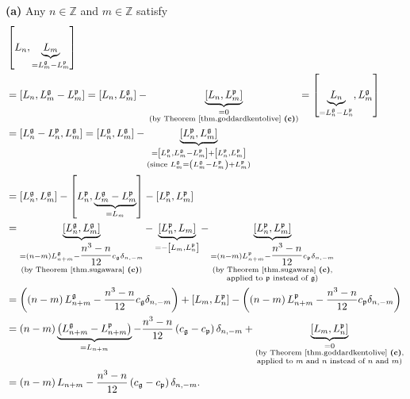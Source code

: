 \documentclass[etingof-lie.tex]{subfiles}
\begin{document}
\textbf{(a)} Any $n\in\mathbb{Z}$ and $m\in\mathbb{Z}$ satisfy%
\begin{align*}
&  \left[  L_{n},\underbrace{L_{m}}_{=L_{m}^{\mathfrak{g}}-L_{m}%
^{\mathfrak{p}}}\right] \\
&  =\left[  L_{n},L_{m}^{\mathfrak{g}}-L_{m}^{\mathfrak{p}}\right]  =\left[
L_{n},L_{m}^{\mathfrak{g}}\right]  -\underbrace{\left[  L_{n},L_{m}%
^{\mathfrak{p}}\right]  }_{\substack{=0\\\text{(by Theorem
\ref{thm.goddardkentolive} \textbf{(c)})}}}=\left[  \underbrace{L_{n}}%
_{=L_{n}^{\mathfrak{g}}-L_{n}^{\mathfrak{p}}},L_{m}^{\mathfrak{g}}\right] \\
&  =\left[  L_{n}^{\mathfrak{g}}-L_{n}^{\mathfrak{p}},L_{m}^{\mathfrak{g}%
}\right]  =\left[  L_{n}^{\mathfrak{g}},L_{m}^{\mathfrak{g}}\right]
-\underbrace{\left[  L_{n}^{\mathfrak{p}},L_{m}^{\mathfrak{g}}\right]
}_{\substack{=\left[  L_{n}^{\mathfrak{p}},L_{m}^{\mathfrak{g}}-L_{m}%
^{\mathfrak{p}}\right]  +\left[  L_{n}^{\mathfrak{p}},L_{m}^{\mathfrak{p}%
}\right]  \\\text{(since }L_{m}^{\mathfrak{g}}=\left(  L_{m}^{\mathfrak{g}%
}-L_{m}^{\mathfrak{p}}\right)  +L_{m}^{\mathfrak{p}}\text{)}}}\\
&  =\left[  L_{n}^{\mathfrak{g}},L_{m}^{\mathfrak{g}}\right]  -\left[
L_{n}^{\mathfrak{p}},\underbrace{L_{m}^{\mathfrak{g}}-L_{m}^{\mathfrak{p}}%
}_{=L_{m}}\right]  -\left[  L_{n}^{\mathfrak{p}},L_{m}^{\mathfrak{p}}\right]
\\
&  =\underbrace{\left[  L_{n}^{\mathfrak{g}},L_{m}^{\mathfrak{g}}\right]
}_{\substack{=\left(  n-m\right)  L_{n+m}^{\mathfrak{g}}-\dfrac{n^{3}-n}%
{12}c_{\mathfrak{g}}\delta_{n,-m}\\\text{(by Theorem \ref{thm.sugawara}
\textbf{(c)})}}}-\underbrace{\left[  L_{n}^{\mathfrak{p}},L_{m}\right]
}_{=-\left[  L_{m},L_{n}^{\mathfrak{p}}\right]  }-\underbrace{\left[
L_{n}^{\mathfrak{p}},L_{m}^{\mathfrak{p}}\right]  }_{\substack{=\left(
n-m\right)  L_{n+m}^{\mathfrak{p}}-\dfrac{n^{3}-n}{12}c_{\mathfrak{p}}%
\delta_{n,-m}\\\text{(by Theorem \ref{thm.sugawara} \textbf{(c)}%
,}\\\text{applied to }\mathfrak{p}\text{ instead of }\mathfrak{g}\text{)}}}\\
&  =\left(  \left(  n-m\right)  L_{n+m}^{\mathfrak{g}}-\dfrac{n^{3}-n}%
{12}c_{\mathfrak{g}}\delta_{n,-m}\right)  +\left[  L_{m},L_{n}^{\mathfrak{p}%
}\right]  -\left(  \left(  n-m\right)  L_{n+m}^{\mathfrak{p}}-\dfrac{n^{3}%
-n}{12}c_{\mathfrak{p}}\delta_{n,-m}\right) \\
&  =\left(  n-m\right)  \underbrace{\left(  L_{n+m}^{\mathfrak{g}}%
-L_{n+m}^{\mathfrak{p}}\right)  }_{=L_{n+m}}-\dfrac{n^{3}-n}{12}\left(
c_{\mathfrak{g}}-c_{\mathfrak{p}}\right)  \delta_{n,-m}+\underbrace{\left[
L_{m},L_{n}^{\mathfrak{p}}\right]  }_{\substack{=0\\\text{(by Theorem
\ref{thm.goddardkentolive} \textbf{(c)},}\\\text{applied to }m\text{ and
}n\text{ instead of }n\text{ and }m\text{)}}}\\
&  =\left(  n-m\right)  L_{n+m}-\dfrac{n^{3}-n}{12}\left(  c_{\mathfrak{g}%
}-c_{\mathfrak{p}}\right)  \delta_{n,-m}.
\end{align*}
\end{document}
